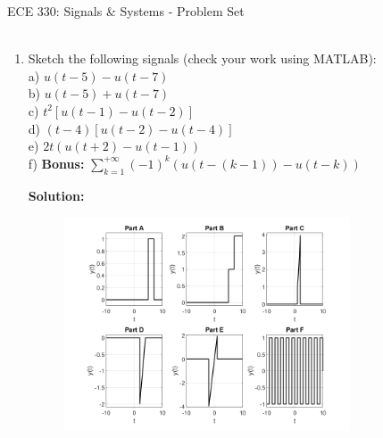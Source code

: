 \documentclass[12pt]{article}
\newenvironment{solution}{\vspace{2mm}\color{blue}\textbf{Solution: }}{\color{black}}
\begin{document}
\begin{center}
{\large ECE 330: Signals \& Systems  -  Problem Set}
\mbox{ }\\
\mbox{ }\\
\end{center}




\begin{enumerate}[\qquad 1)]

    \item Sketch the following signals (check your work using MATLAB):
    \\ a) $u(t-5) - u(t-7)$
    \\ b) $u(t-5) + u(t-7)$
    \\ c) $t^2[u(t-1) - u(t-2)]$
    \\ d) $(t-4)[u(t-2) - u(t-4)]$
    \\ e) $2t(u(t+2) - u(t-1))$ 
    \\ f) \textbf{Bonus: } $\sum_{k=1}^{+\infty} (-1)^k (u(t - (k-1)) - u(t - k))$

    \begin{solution}
        \begin{figure}[htbp]
            \centering
            \includegraphics[width=0.8\textwidth]{images/problem2.png}
            \label{fig:Problem1}
        \end{figure}
    \end{solution}


    \newpage



\end{enumerate}
\end{document}
